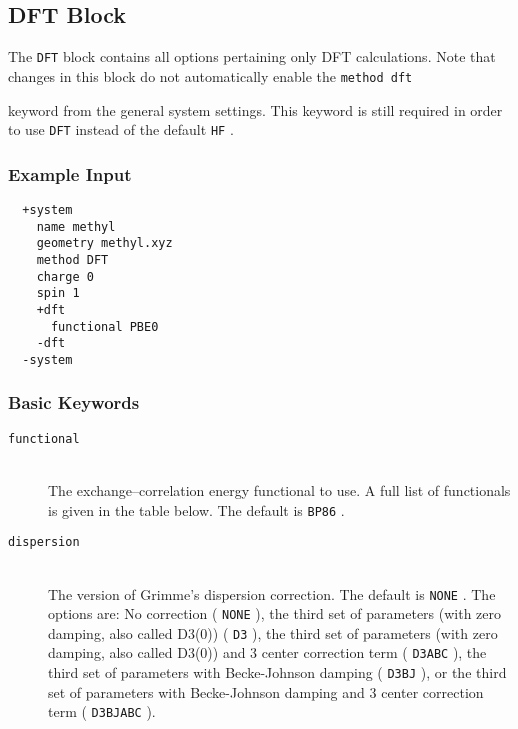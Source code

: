 \documentclass[bibliography=totocnumbered,a4paper,10pt,oneside]{scrbook}
\newcommand{\ttt}[1]{%
  \begingroup\setlength{\fboxsep}{1pt}%
  \colorbox{serenity-green!30}{\texttt{\hspace*{2pt}\vphantom{(g}#1\hspace*{2pt}}}%
  \endgroup
}
\begin{document}
\subsection{DFT Block}\label{sec:system:dft}
The \ttt{DFT} block contains all options pertaining only DFT calculations.
Note that changes in this block do not automatically enable the \ttt{method dft}
keyword from the general system settings.
This keyword is still required in order to use \ttt{DFT} instead of the default \ttt{HF}.
\subsubsection{Example Input}
\begin{lstlisting}
  +system
    name methyl 
    geometry methyl.xyz
    method DFT 
    charge 0
    spin 1
    +dft
      functional PBE0
    -dft
  -system
 \end{lstlisting}
\subsubsection{Basic Keywords}
\begin{description}
  \item [\texttt{functional}]\hfill \\
  The exchange--correlation energy functional to use. A full list of functionals is given in the table below.
  The default is \ttt{BP86}.
 \item [\texttt{dispersion}]\hfill \\
 The version of Grimme's dispersion correction. The default is \ttt{NONE}. The options are:
 No correction (\ttt{NONE}), the third set of parameters (with zero damping, also called D3(0)) (\ttt{D3}),
 the third set of parameters (with zero damping, also called D3(0)) and 3 center correction term (\ttt{D3ABC}),
 the third set of parameters with Becke-Johnson damping (\ttt{D3BJ}),
 or the third set of parameters with Becke-Johnson damping and 3 center correction term (\ttt{D3BJABC}).
\end{description}
\end{document}
